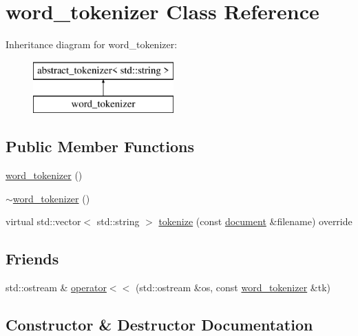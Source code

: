 \hypertarget{classword__tokenizer}{}\section{word\+\_\+tokenizer Class Reference}
\label{classword__tokenizer}
Inheritance diagram for word\+\_\+tokenizer\+:\begin{figure}[H]
\begin{center}
\leavevmode
\includegraphics[height=2.000000cm]{classword__tokenizer}
\end{center}
\end{figure}
\subsection*{Public Member Functions}
\begin{DoxyCompactItemize}
\item 
\hyperlink{classword__tokenizer_a30887805b70d364fb6fde6cdd814c16a}{word\+\_\+tokenizer} ()
\item 
\hyperlink{classword__tokenizer_a19a17890aac719ba8cb1459713f5a96e}{$\sim$word\+\_\+tokenizer} ()
\item 
virtual std\+::vector$<$ std\+::string $>$ \hyperlink{classword__tokenizer_ac51f61652880447073e16fdb0f471fbe}{tokenize} (const \hyperlink{classdocument}{document} \&filename) override
\end{DoxyCompactItemize}
\subsection*{Friends}
\begin{DoxyCompactItemize}
\item 
std\+::ostream \& \hyperlink{classword__tokenizer_a570983076ba46499d5bebccccac99a4a}{operator$<$$<$} (std\+::ostream \&os, const \hyperlink{classword__tokenizer}{word\+\_\+tokenizer} \&tk)
\end{DoxyCompactItemize}


\subsection{Constructor \& Destructor Documentation}
\mbox{\label{classword__tokenizer_a30887805b70d364fb6fde6cdd814c16a}} 
